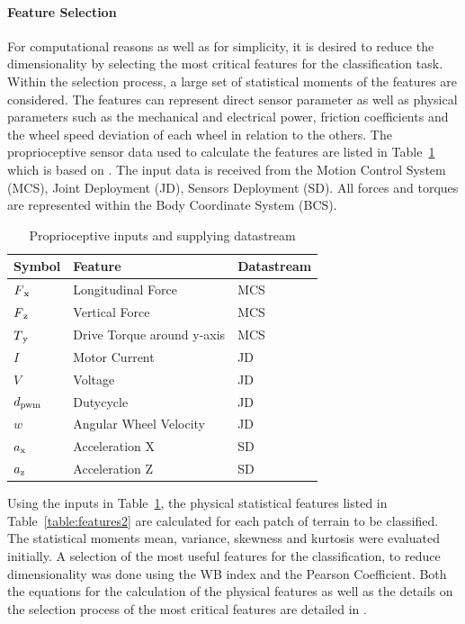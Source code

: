 \documentclass{article}
\begin{document}
\paragraph*{Feature Selection}
For computational reasons as well as for simplicity, it is desired to reduce the dimensionality by selecting the most critical features for the  classification task.
Within the selection process, a large set of statistical moments of the features are considered. 
The features can represent direct sensor parameter as well as physical parameters such as the mechanical and electrical power, friction coefficients and the wheel speed deviation of each wheel in relation to the others. 
The proprioceptive sensor data used to calculate the features are listed in Table~\ref{table:features1} which is based on \cite{Dimastrogiovanni2020}.
The input data is received from the Motion Control System (MCS), Joint Deployment (JD), Sensors Deployment (SD). 
All forces and torques are represented within the Body Coordinate System (BCS).

\begin{table}[htb!]
   \centering
    \begin{tabularx}{\columnwidth}{XXX}
    \textbf{Symbol}& \textbf{Feature} & \textbf{Datastream}  \\
    \hline
      $F\textsubscript{x}$ & Longitudinal Force	 &  MCS\\
      $F\textsubscript{z}$& Vertical Force	 &MCS \\ 
      $T\textsubscript{y}$& Drive Torque around y-axis	   &MCS\\ 
      $I $& Motor Current	  & JD\\ 
      $V$ & Voltage 	   &JD\\ 
      $d\textsubscript{pwm}$&  Dutycycle	   &JD\\ 
      $w$& Angular Wheel Velocity 	 &JD \\
      $a\textsubscript{x}$& Acceleration X	  &SD\\ 
      $a\textsubscript{z}$&  Acceleration Z	   &SD\\ 
    \end{tabularx}
    \caption{Proprioceptive inputs and supplying datastream}
    \label{table:features1}
\end{table}

Using the inputs in Table~\ref{table:features1}, the physical statistical features listed in Table~\ref{table:features2} are calculated for each patch of terrain to be classified.
The statistical moments mean, variance, skewness and kurtosis were evaluated initially. 
A selection of the most useful features for the classification, to reduce dimensionality was done using the WB index and the Pearson Coefficient.
Both the equations for the calculation of the physical features as well as the details on the selection process of the most critical features are detailed in \cite{Dimastrogiovanni2020}.
\end{document}
